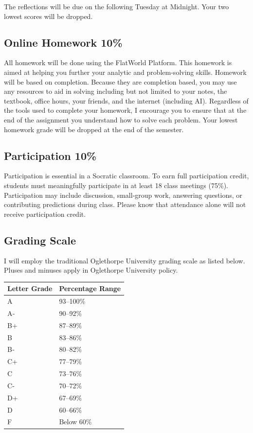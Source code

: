 \documentclass[
]{book}
\begin{document}
The reflections will be due on the following Tuesday at Midnight. Your two lowest scores will be dropped.

\subsection*{Online Homework 10\%}\label{online-homework-10}

All homework will be done using the FlatWorld Platform. This homework is aimed at helping you further your analytic and problem-solving skills. Homework will be based on completion. Because they are completion based, you may use any resources to aid in solving including but not limited to your notes, the textbook, office hours, your friends, and the internet (including AI). Regardless of the tools used to complete your homework, I encourage you to ensure that at the end of the assignment you understand how to solve each problem. Your lowest homework grade will be dropped at the end of the semester.

\subsection*{Participation 10\%}\label{participation-10}

Participation is essential in a Socratic classroom. To earn full participation credit, students must meaningfully participate in at least 18 class meetings (75\%). Participation may include discussion, small‑group work, answering questions, or contributing predictions during class. Please know that attendance alone will not receive participation credit.

\subsection*{Grading Scale}\label{grading-scale}

I will employ the traditional Oglethorpe University grading scale as listed below. Pluses and minuses apply in Oglethorpe University policy.

\begin{longtable}[]{@{}ll@{}}
\toprule\noalign{}
Letter Grade & Percentage Range \\
\midrule\noalign{}
\endhead
\bottomrule\noalign{}
\endlastfoot
A & 93--100\% \\
A‑ & 90--92\% \\
B+ & 87--89\% \\
B & 83--86\% \\
B‑ & 80--82\% \\
C+ & 77--79\% \\
C & 73--76\% \\
C‑ & 70--72\% \\
D+ & 67--69\% \\
D & 60--66\% \\
F & Below 60\% \\
\end{longtable}
\end{document}
